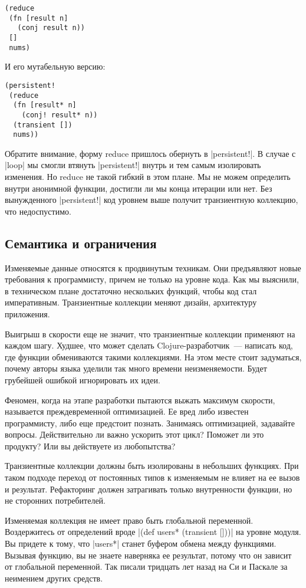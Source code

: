 \begin{verbatim}
(reduce
 (fn [result n]
   (conj result n))
 []
 nums)
\end{verbatim}

И его мутабельную версию:

\begin{verbatim}
(persistent!
 (reduce
  (fn [result* n]
    (conj! result* n))
  (transient [])
  nums))
\end{verbatim}

Обратите внимание, форму reduce пришлось обернуть в \spverb|persistent!|. В случае с
\spverb|loop| мы смогли втянуть \spverb|persistent!| внутрь и тем самым изолировать
изменения. Но reduce не такой гибкий в этом плане. Мы не можем определить внутри
анонимной функции, достигли ли мы конца итерации или нет. Без вынужденного
\spverb|persistent!| код уровнем выше получит транзиентную коллекцию, что недоспустимо.

\subsection{Семантика и ограничения}

Изменяемые данные относятся к продвинутым техникам. Они предъявляют новые
требования к программисту, причем не только на уровне кода. Как мы выяснили, в
техническом плане достаточно нескольких функций, чтобы код стал
императивным. Транзиентные коллекции меняют дизайн, архитектуру приложения.

Выигрыш в скорости еще не значит, что транзиентные коллекции применяют на каждом
шагу. Худшее, что может сделать Clojure-разработчик~--- написать код, где функции
обмениваются такими коллекциями. На этом месте стоит задуматься, почему авторы
языка уделили так много времени неизменяемости. Будет грубейшей ошибкой
игнорировать их идеи.

Феномен, когда на этапе разработки пытаются выжать максимум скорости, называется
преждевременной оптимизацией. Ее вред либо известен программисту, либо еще
предстоит познать. Занимаясь оптимизацией, задавайте вопросы. Действительно ли
важно ускорить этот цикл? Поможет ли это продукту? Или вы действуете из
любопытства?

Транзиентные коллекции должны быть изолированы в небольших функциях. При таком
подходе переход от постоянных типов к изменяемым не влияет на ее вызов и
результат. Рефакторинг должен затрагивать только внутренности функции, но не
сторонних потребителей.

Изменяемая коллекция не имеет право быть глобальной переменной. Воздержитесь от
определений вроде \spverb|(def users* (transient []))| на уровне модуля. Вы придете к
тому, что \spverb|users*| станет буфером обмена между функциями. Вызывая функцию, вы не
знаете наверняка ее результат, потому что он зависит от глобальной
переменной. Так писали тридцать лет назад на Си и Паскале за неимением других
средств.

